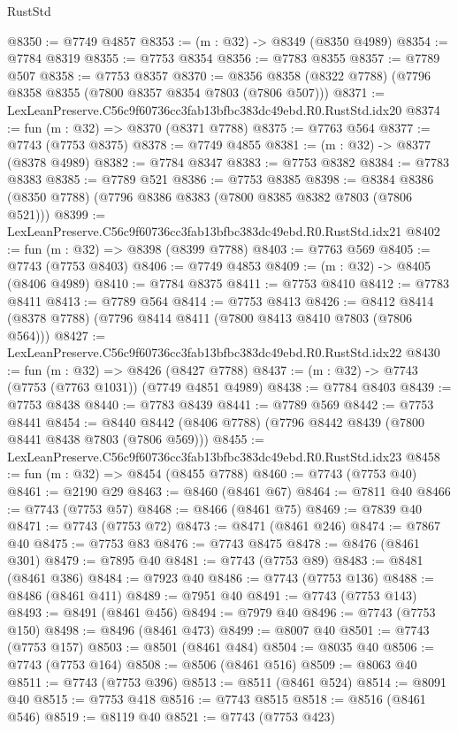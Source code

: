 \begin{lexlean}{RustStd}
\begin{coremodule}
@8350 := @7749 @4857
@8353 := (m : @32) -> @8349 (@8350 @4989)
@8354 := @7784 @8319
@8355 := @7753 @8354
@8356 := @7783 @8355
@8357 := @7789 @507
@8358 := @7753 @8357
@8370 := @8356 @8358 (@8322 @7788) (@7796 @8358 @8355 (@7800 @8357 @8354 @7803 (@7806 @507)))
@8371 := LexLeanPreserve.C56c9f60736cc3fab13bfbc383dc49ebd.R0.RustStd.idx20
@8374 := fun (m : @32) => @8370 (@8371 @7788)
@8375 := @7763 @564
@8377 := @7743 (@7753 @8375)
@8378 := @7749 @4855
@8381 := (m : @32) -> @8377 (@8378 @4989)
@8382 := @7784 @8347
@8383 := @7753 @8382
@8384 := @7783 @8383
@8385 := @7789 @521
@8386 := @7753 @8385
@8398 := @8384 @8386 (@8350 @7788) (@7796 @8386 @8383 (@7800 @8385 @8382 @7803 (@7806 @521)))
@8399 := LexLeanPreserve.C56c9f60736cc3fab13bfbc383dc49ebd.R0.RustStd.idx21
@8402 := fun (m : @32) => @8398 (@8399 @7788)
@8403 := @7763 @569
@8405 := @7743 (@7753 @8403)
@8406 := @7749 @4853
@8409 := (m : @32) -> @8405 (@8406 @4989)
@8410 := @7784 @8375
@8411 := @7753 @8410
@8412 := @7783 @8411
@8413 := @7789 @564
@8414 := @7753 @8413
@8426 := @8412 @8414 (@8378 @7788) (@7796 @8414 @8411 (@7800 @8413 @8410 @7803 (@7806 @564)))
@8427 := LexLeanPreserve.C56c9f60736cc3fab13bfbc383dc49ebd.R0.RustStd.idx22
@8430 := fun (m : @32) => @8426 (@8427 @7788)
@8437 := (m : @32) -> @7743 (@7753 (@7763 @1031)) (@7749 @4851 @4989)
@8438 := @7784 @8403
@8439 := @7753 @8438
@8440 := @7783 @8439
@8441 := @7789 @569
@8442 := @7753 @8441
@8454 := @8440 @8442 (@8406 @7788) (@7796 @8442 @8439 (@7800 @8441 @8438 @7803 (@7806 @569)))
@8455 := LexLeanPreserve.C56c9f60736cc3fab13bfbc383dc49ebd.R0.RustStd.idx23
@8458 := fun (m : @32) => @8454 (@8455 @7788)
@8460 := @7743 (@7753 @40)
@8461 := @2190 @29
@8463 := @8460 (@8461 @67)
@8464 := @7811 @40
@8466 := @7743 (@7753 @57)
@8468 := @8466 (@8461 @75)
@8469 := @7839 @40
@8471 := @7743 (@7753 @72)
@8473 := @8471 (@8461 @246)
@8474 := @7867 @40
@8475 := @7753 @83
@8476 := @7743 @8475
@8478 := @8476 (@8461 @301)
@8479 := @7895 @40
@8481 := @7743 (@7753 @89)
@8483 := @8481 (@8461 @386)
@8484 := @7923 @40
@8486 := @7743 (@7753 @136)
@8488 := @8486 (@8461 @411)
@8489 := @7951 @40
@8491 := @7743 (@7753 @143)
@8493 := @8491 (@8461 @456)
@8494 := @7979 @40
@8496 := @7743 (@7753 @150)
@8498 := @8496 (@8461 @473)
@8499 := @8007 @40
@8501 := @7743 (@7753 @157)
@8503 := @8501 (@8461 @484)
@8504 := @8035 @40
@8506 := @7743 (@7753 @164)
@8508 := @8506 (@8461 @516)
@8509 := @8063 @40
@8511 := @7743 (@7753 @396)
@8513 := @8511 (@8461 @524)
@8514 := @8091 @40
@8515 := @7753 @418
@8516 := @7743 @8515
@8518 := @8516 (@8461 @546)
@8519 := @8119 @40
@8521 := @7743 (@7753 @423)

\end{coremodule}
\end{lexlean}
